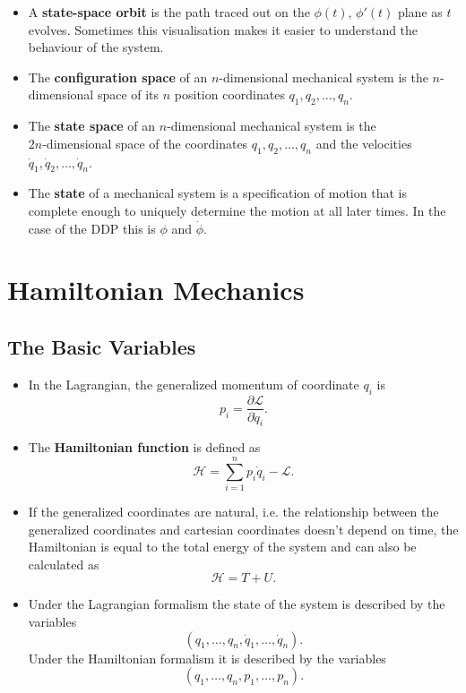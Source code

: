 \documentclass{article}
\begin{document}
\begin{itemize}
  \item A \textbf{state-space orbit} is the path traced out on the $\phi(t)$, $\phi'(t)$ plane as $t$ evolves. Sometimes this visualisation makes it easier to understand the behaviour of the system.

  \item The \textbf{configuration space} of an $n$-dimensional mechanical system is the $n$-dimensional space of its $n$ position coordinates $q_1, q_2, \ldots, q_n$.

  \item The \textbf{state space} of an $n$-dimensional mechanical system is the \\ $2 n$-dimensional space of the coordinates $q_1, q_2, \ldots, q_n$ and the velocities $\dot{q}_1, \dot{q}_2, \ldots, \dot{q}_n$.

  \item The \textbf{state} of a mechanical system is a specification of motion that is complete enough to uniquely determine the motion at all later times. In the case of the DDP this is $\phi$ and $\dot{\phi}$.
\end{itemize}

\section{Hamiltonian Mechanics}

\subsection{The Basic Variables}

\begin{itemize}
  \item In the Lagrangian, the generalized momentum of coordinate $q_i$ is \[p_i = \frac{\partial \mathcal{L}}{\partial \dot{q}_i}.\]

  \item The \textbf{Hamiltonian function} is defined as \[\mathcal{H} = \sum_{i = 1}^n p_i \dot{q}_i - \mathcal{L}.\]

\item If the generalized coordinates are natural, i.e. the relationship between the generalized coordinates and cartesian coordinates doesn't depend on time, the Hamiltonian is equal to the total energy of the system and can also be calculated as \[\mathcal{H} = T + U.\]

  \item Under the Lagrangian formalism the state of the system is described by the variables \[(q_1, \ldots, q_n, \dot{q}_1, \ldots, \dot{q}_n).\] Under the Hamiltonian formalism it is described by the variables \[(q_1, \ldots, q_n, p_1, \ldots, p_n).\]
\end{itemize}
\end{document}
